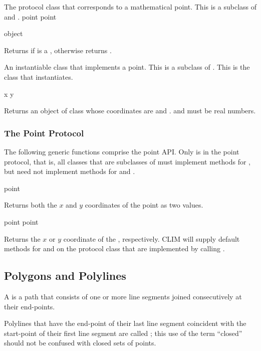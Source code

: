 
The protocol class that corresponds to a mathematical point.  This is a subclass
of  and .
 {point} {point}

 {object}

Returns  if  is a , otherwise returns
.


An instantiable class that implements a point.  This is a subclass of .
This is the class that  instantiates.  
\Immutable

 {x y}

Returns an object of class  whose coordinates are  and
.   and  must be real numbers.


\subsubsection {The Point Protocol}

The following generic functions comprise the point API.  Only
 is in the point protocol, that is, all classes that are
subclasses of  must implement methods for , but
need not implement methods for  and .

 {point}

Returns both the $x$ and $y$ coordinates of the point  as two values.

 {point}
 {point}

Returns the $x$ or $y$ coordinate of the  , respectively.
CLIM will supply default methods for  and  on the
protocol class  that are implemented by calling .


\subsection {Polygons and Polylines}

A  is a path that consists of one or more line segments joined
consecutively at their end-points.

Polylines that have the end-point of their last line segment coincident with the
start-point of their first line segment are called ; this use of
the term ``closed'' should not be confused with closed sets of points.

